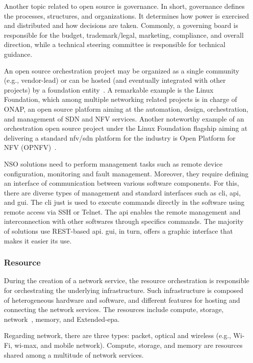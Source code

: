 Another topic related to open source is governance. In short, governance defines the processes, structures, and organizations. It determines how power is exercised and distributed and how decisions are taken. Commonly, a governing board is responsible for the budget, trademark/legal, marketing, compliance, and overall direction, while a technical steering committee is responsible for technical guidance. 

An open source orchestration project may be organized as a single community (e.g., vendor-lead) or can be hosted (and eventually integrated with other projects) by a foundation entity~\cite{Opensource.comFourOpensource.com}. A remarkable example is the Linux Foundation, which among multiple networking related projects is in charge of  ONAP, an open source platform aiming at the automation, design, orchestration, and management of SDN and NFV services. Another noteworthy example of an orchestration open source project under the Linux Foundation flagship aiming at delivering a standard \gls{nfv}/\gls{sdn} platform for the industry is Open Platform for NFV (OPNFV)~\cite{LinuxFoundation}.

NSO solutions need to perform management tasks such as remote device configuration, monitoring and fault management. Moreover, they require defining an interface of communication between various software components. For this, there are diverse types of management and  standard interfaces such as \gls{cli}, \gls{api}, and \gls{gui}. The \gls{cli} just is used to execute commands directly in the software using remote access via SSH or Telnet. The \gls{api} enables the remote management and interconnection with other softwares through specifics commands. The majority of solutions use REST-based \gls{api}. \gls{gui}, in turn, offers a graphic interface that makes it easier its use.   

\subsubsection{Resource}
During the creation of a network service, the resource orchestration is responsible for orchestrating the underlying infrastructure. Such infrastructure is composed of heterogeneous hardware and software, and different features for hosting and connecting the network services. The resources include compute, storage, network~\cite{Ordonez-Lucena2017NetworkChallenges}, memory, and Extended-\gls{epa}. 

Regarding network, there are three types: packet, optical and wireless (e.g., Wi-Fi, wi-max, and mobile network). Compute, storage, and memory are resources shared among a multitude of network services.  

